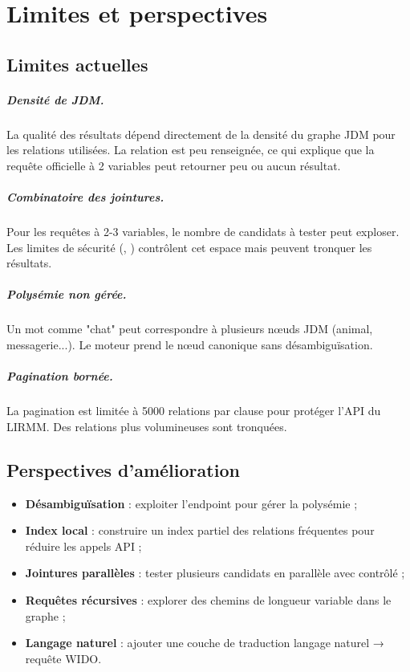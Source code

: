 \chapter{Limites et perspectives}
\label{chap:limites}

\section{Limites actuelles}

\paragraph{Densité de JDM.} La qualité des résultats dépend directement de la densité du graphe JDM pour les relations utilisées. La relation  est peu renseignée, ce qui explique que la requête officielle à 2 variables peut retourner peu ou aucun résultat.

\paragraph{Combinatoire des jointures.} Pour les requêtes à 2-3 variables, le nombre de candidats à tester peut exploser. Les limites de sécurité (, ) contrôlent cet espace mais peuvent tronquer les résultats.

\paragraph{Polysémie non gérée.} Un mot comme "chat" peut correspondre à plusieurs nœuds JDM (animal, messagerie...). Le moteur prend le nœud canonique sans désambiguïsation.

\paragraph{Pagination bornée.} La pagination est limitée à 5000 relations par clause pour protéger l'API du LIRMM. Des relations plus volumineuses sont tronquées.

\section{Perspectives d'amélioration}

\begin{itemize}
    \item \textbf{Désambiguïsation} : exploiter l'endpoint  pour gérer la polysémie ;
    \item \textbf{Index local} : construire un index partiel des relations fréquentes pour réduire les appels API ;
    \item \textbf{Jointures parallèles} : tester plusieurs candidats en parallèle avec  contrôlé ;
    \item \textbf{Requêtes récursives} : explorer des chemins de longueur variable dans le graphe ;
    \item \textbf{Langage naturel} : ajouter une couche de traduction langage naturel → requête WIDO.
\end{itemize}

